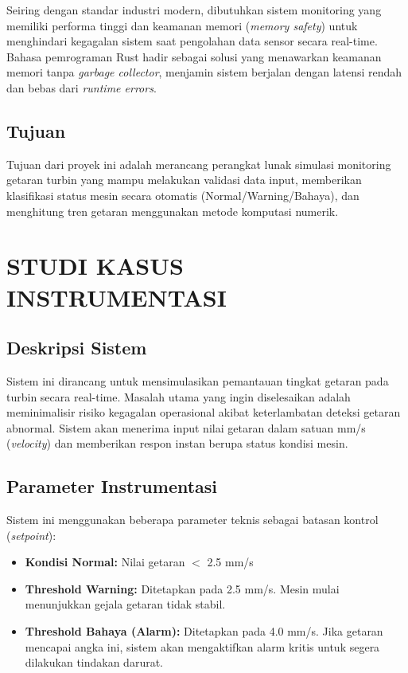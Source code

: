 \documentclass[12pt,a4paper]{article}
\begin{document}
Seiring dengan standar industri modern, dibutuhkan sistem monitoring yang memiliki performa tinggi dan keamanan memori (\textit{memory safety}) untuk menghindari kegagalan sistem saat pengolahan data sensor secara real-time. Bahasa pemrograman Rust hadir sebagai solusi yang menawarkan keamanan memori tanpa \textit{garbage collector}, menjamin sistem berjalan dengan latensi rendah dan bebas dari \textit{runtime errors}.

\subsection{Tujuan}
Tujuan dari proyek ini adalah merancang perangkat lunak simulasi monitoring getaran turbin yang mampu melakukan validasi data input, memberikan klasifikasi status mesin secara otomatis (Normal/Warning/Bahaya), dan menghitung tren getaran menggunakan metode komputasi numerik.

\section{STUDI KASUS INSTRUMENTASI}

\subsection{Deskripsi Sistem}
Sistem ini dirancang untuk mensimulasikan pemantauan tingkat getaran pada turbin secara real-time. Masalah utama yang ingin diselesaikan adalah meminimalisir risiko kegagalan operasional akibat keterlambatan deteksi getaran abnormal. Sistem akan menerima input nilai getaran dalam satuan mm/s (\textit{velocity}) dan memberikan respon instan berupa status kondisi mesin.

\subsection{Parameter Instrumentasi}
Sistem ini menggunakan beberapa parameter teknis sebagai batasan kontrol (\textit{setpoint}):
\begin{itemize}[noitemsep]
    \item \textbf{Kondisi Normal:} Nilai getaran $<$ 2.5 mm/s
    \item \textbf{Threshold Warning:} Ditetapkan pada 2.5 mm/s. Mesin mulai menunjukkan gejala getaran tidak stabil.
    \item \textbf{Threshold Bahaya (Alarm):} Ditetapkan pada 4.0 mm/s. Jika getaran mencapai angka ini, sistem akan mengaktifkan alarm kritis untuk segera dilakukan tindakan darurat.
\end{itemize}
\end{document}
